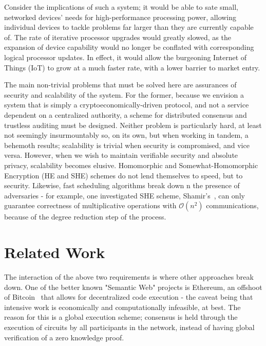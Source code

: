 \documentclass[journal]{IEEEtran}
\begin{document}
\par Consider the implications of such a system; it would be able to sate small, networked devices' needs for high-performance processing power, allowing individual devices to tackle problems far larger than they are currently capable of. The rate of iterative processor upgrades would greatly slowed, as the expansion of device capability would no longer be conflated with corresponding logical processor updates. In effect, it would allow the burgeoning Internet of Things (IoT) to grow at a much faster rate, with a lower barrier to market entry.

\par The main non-trivial problems that must be solved here are assurances of security and scalability of the system. For the former, because we envision a system that is simply a cryptoeconomically-driven protocol, and not a service dependent on a centralized authority, a scheme for distributed consensus and trustless auditing must be designed. Neither problem is particularly hard, at least not seemingly insurmountably so, on its own, but when working in tandem, a behemoth results; scalability is trivial when security is compromised, and vice versa. However, when we wish to maintain verifiable security and absolute privacy, scalability becomes elusive. Homomorphic and Somewhat-Homomorphic Encryption (HE and SHE) schemes do not lend themselves to speed, but to security. Likewise, fast scheduling algorithms break down n the presence of adversaries - for example, one investigated SHE scheme, Shamir's~\cite{Shamir1979HowSecret}, can only guarantee correctness of multiplicative operations with $\mathcal{O}(n^2)$ communications, because of the degree reduction step of the process. 


\section{Related Work}
\par The interaction of the above two requirements is where other approaches break down. One of the better known "Semantic Web" projects is Ethereum\cite{Wood2014Ethereum:Ledger}, an offshoot of Bitcoin~\cite{Nakamoto2008Bitcoin:System} that allows for decentralized code execution - the caveat being that intensive work is economically and computationally infeasible, at best. The reason for this is a global execution scheme; consensus is held through the execution of circuits by all participants in the network, instead of having global verification of a zero knowledge proof. 
\end{document}
